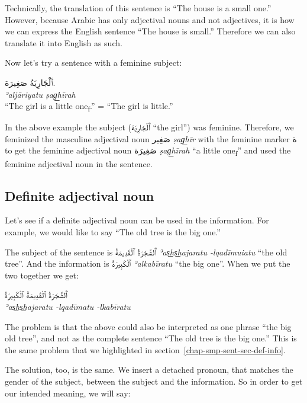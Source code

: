 \documentclass[
  10pt,
]{book}
\begin{document}
Technically, the translation of this sentence is \enquote{The house is a small one.}
However, because Arabic has only adjectival nouns and not adjectives, it is how we can express the English sentence \enquote{The house is small.} Therefore we can also translate it into English as such.

Now let's try a sentence with a feminine subject:

\foreignlanguage{arabic}{ٱَلْجَارِيَةُ صَغِيرَة.}\\
\emph{ʾaljāriyatu ṣag͟hīrah}\\
\enquote{The girl is a little one\textsubscript{f}.} = \enquote{The girl is little.}

In the above example the subject (\foreignlanguage{arabic}{ٱَلْجَارِيَة} \enquote{the girl}) was feminine. Therefore, we feminized the masculine adjectival noun \foreignlanguage{arabic}{صَغِير} \emph{ṣag͟hīr} with the feminine marker \foreignlanguage{arabic}{ة} to get the feminine adjectival noun
\foreignlanguage{arabic}{صَغِيرَة} \emph{ṣag͟hīrah} \enquote{a little one\textsubscript{f}}
and used the feminine adjectival noun in the sentence.

\subsection{Definite adjectival noun}\label{definite-adjectival-noun}

Let's see if a definite adjectival noun can be used in the information. For example, we would like to say \enquote{The old tree is the big one.}

The subject of the sentence is \foreignlanguage{arabic}{ٱَلشَّجَرَةُ ٱلْقَدِيمَةُ} \emph{ʾas͟hs͟hajaratu -lqadīmuiatu} \enquote{the old tree}.
And the information is \foreignlanguage{arabic}{ٱلْکَبِيرَةُ} \emph{ʾalkabīratu} \enquote{the big one}. When we put the two together we get:

\foreignlanguage{arabic}{ٱَلشَّجَرَةُ ٱلْقَدِيمَةُ ٱلْکَبِيرَةُ}\\
\emph{ʾas͟hs͟hajaratu -lqadīmatu -lkabīratu}

The problem is that the above could also be interpreted as one phrase \enquote{the big old tree}, and not as the complete sentence \enquote{The old tree is the big one.} This is the same problem that we highlighted in section~\ref{chap-smp-sent-sec-def-info}.

The solution, too, is the same. We insert a detached pronoun, that matches the gender of the subject, between the subject and the information. So in order to get our intended meaning, we will say:
\end{document}
